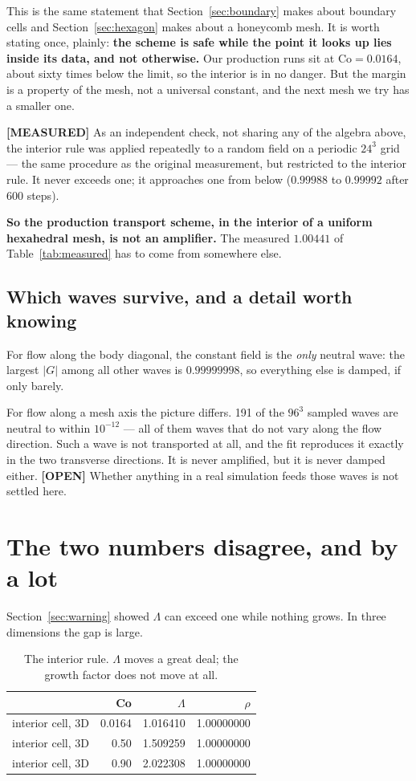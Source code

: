 \documentclass[11pt,a4paper]{article}
\newcommand{\measured}{\textcolor{green!35!black}{\textbf{[MEASURED]}}}
\newcommand{\opn}{\textcolor{orange!80!black}{\textbf{[OPEN]}}}
\begin{document}
This is the same statement that Section~\ref{sec:boundary} makes about boundary cells and
Section~\ref{sec:hexagon} makes about a honeycomb mesh. It is worth stating once, plainly:
\textbf{the scheme is safe while the point it looks up lies inside its data, and not
otherwise.} Our production runs sit at $\mathrm{Co} = 0.0164$, about sixty times below the
limit, so the interior is in no danger. But the margin is a property of the mesh, not a
universal constant, and the next mesh we try has a smaller one.

\measured{} As an independent check, not sharing any of the algebra above, the interior rule
was applied repeatedly to a random field on a periodic $24^3$ grid --- the same procedure as
the original measurement, but restricted to the interior rule. It never exceeds one; it
approaches one from below ($0.99988$ to $0.99992$ after 600 steps).

\textbf{So the production transport scheme, in the interior of a uniform hexahedral mesh, is
not an amplifier.} The measured $1.00441$ of Table~\ref{tab:measured} has to come from
somewhere else.

\subsection{Which waves survive, and a detail worth knowing}

For flow along the body diagonal, the constant field is the \emph{only} neutral wave: the
largest $|G|$ among all other waves is $0.99999998$, so everything else is damped, if only
barely.

For flow along a mesh axis the picture differs. 191 of the $96^3$ sampled waves are neutral
to within $10^{-12}$ --- all of them waves that do not vary along the flow direction. Such a
wave is not transported at all, and the fit reproduces it exactly in the two transverse
directions. It is never amplified, but it is never damped either. \opn{} Whether anything in
a real simulation feeds those waves is not settled here.

\section{The two numbers disagree, and by a lot}
\label{sec:lambda}

Section~\ref{sec:warning} showed $\Lambda$ can exceed one while nothing grows. In three
dimensions the gap is large.

\begin{table}[h]
\centering
\caption{The interior rule. $\Lambda$ moves a great deal; the growth factor does not move at
all.}
\begin{tabular}{lrrr}
\toprule
 & Co & $\Lambda$ & $\rho$ \\
\midrule
interior cell, 3D & 0.0164 & 1.016410 & 1.00000000 \\
interior cell, 3D & 0.50   & 1.509259 & 1.00000000 \\
interior cell, 3D & 0.90   & 2.022308 & 1.00000000 \\
\bottomrule
\end{tabular}
\end{table}
\end{document}
